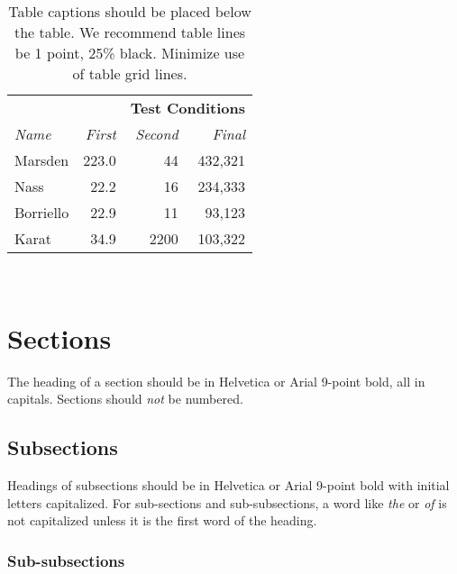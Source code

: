 \documentclass{sigchi}
\begin{document}

\begin{table}
  \centering
  \begin{tabular}{l r r r}
    & & \multicolumn{2}{c}{\small{\textbf{Test Conditions}}} \\
    \cmidrule(r){3-4}
    {\small\textit{Name}}
    & {\small \textit{First}}
      & {\small \textit{Second}}
    & {\small \textit{Final}} \\
    \midrule
    Marsden & 223.0 & 44 & 432,321 \\
    Nass & 22.2 & 16 & 234,333 \\
    Borriello & 22.9 & 11 & 93,123 \\
    Karat & 34.9 & 2200 & 103,322 \\
  \end{tabular}
  \caption{Table captions should be placed below the table. We
    recommend table lines be 1 point, 25\% black. Minimize use of
    table grid lines.}~\label{tab:table1}
\end{table}

\section{Sections}

The heading of a section should be in Helvetica or Arial 9-point bold,
all in capitals. Sections should \textit{not} be numbered.

\subsection{Subsections}

Headings of subsections should be in Helvetica or Arial 9-point bold
with initial letters capitalized.  For sub-sections and
sub-subsections, a word like \emph{the} or \emph{of} is not
capitalized unless it is the first word of the heading.

\subsubsection{Sub-subsections}
\end{document}
